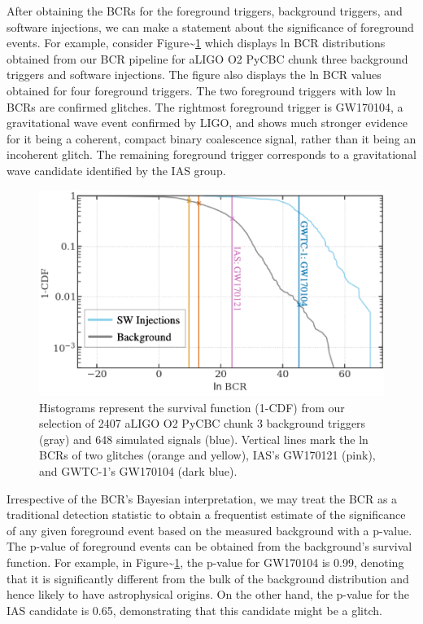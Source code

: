 \documentclass[%
 reprint,
 amsmath,amssymb,
 aps,
]{revtex4}
\begin{document}
After obtaining the BCRs for the foreground triggers, background triggers, and software injections, we can make a
statement about the significance of foreground events. For example, consider Figure\textasciitilde\ref{fig:bcrCdf} which displays ln
BCR distributions obtained from our BCR pipeline for aLIGO O2 PyCBC chunk three background triggers and software injections.
The figure also displays the ln BCR values obtained for four foreground triggers. The two foreground triggers with low
ln BCRs are confirmed glitches. The rightmost foreground trigger is GW170104, a gravitational wave event confirmed by
LIGO, and shows much stronger evidence for it being a coherent, compact binary coalescence signal, rather than it being
an incoherent glitch. The remaining foreground trigger corresponds to a gravitational wave candidate identified by the
IAS group.



\begin{figure}[!h]

{\centering \includegraphics[width=0.75\linewidth]{images/bcr_cdf} 

}

\caption[BCR distribution example]{Histograms represent the survival function (1-CDF) from our selection of 2407 aLIGO O2 PyCBC chunk 3 background triggers (gray) and 648 simulated signals (blue). Vertical lines mark the ln BCRs of two glitches (orange and yellow), IAS's GW170121 (pink), and GWTC-1's GW170104 (dark blue).}\label{fig:bcrCdf}
\end{figure}

Irrespective of the BCR's Bayesian interpretation, we may treat the BCR as a traditional detection statistic to obtain a
frequentist estimate of the significance of any given foreground event based on the measured background with a p-value.
The p-value of foreground events can be obtained from the background's survival function. For example, in
Figure\textasciitilde\ref{fig:bcrCdf}, the p-value for GW170104 is 0.99, denoting that it is significantly different from the bulk
of the background distribution and hence likely to have astrophysical origins. On the other hand, the p-value for the
IAS candidate is 0.65, demonstrating that this candidate might be a glitch.
\end{document}
